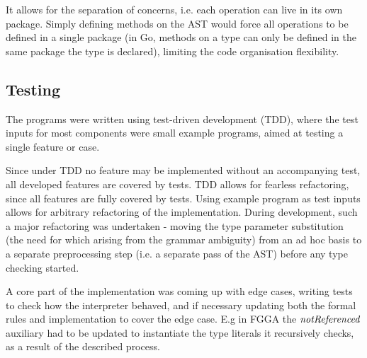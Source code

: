 It allows for the separation of concerns, i.e. each operation can live in its
own package. Simply defining methods on the AST would force all operations to be
defined in a single package (in Go, methods on a type can only be defined in the
same package the type is declared), limiting the code organisation flexibility.




\subsection{Testing}

The programs were written using test-driven development (TDD), where the test
inputs for most components were small example programs, aimed at testing a
single feature or case.

Since under TDD no feature may be implemented without an accompanying test, all
developed features are covered by tests. TDD allows for fearless refactoring,
since all features are fully covered by tests. Using example program as test
inputs allows for arbitrary refactoring of the implementation. During
development, such a major refactoring was undertaken - moving the type parameter
substitution (the need for which arising from the grammar ambiguity) from an ad
hoc basis to a separate preprocessing step (i.e. a separate pass of the AST)
before any type checking started.

A core part of the implementation was coming up with edge cases, writing tests
to check how the interpreter behaved, and if necessary updating both the formal
rules and implementation to cover the edge case. E.g in FGGA the $\mathit{notReferenced}$
auxiliary had to be updated to instantiate the type literals it recursively
checks, as a result of the described process.

